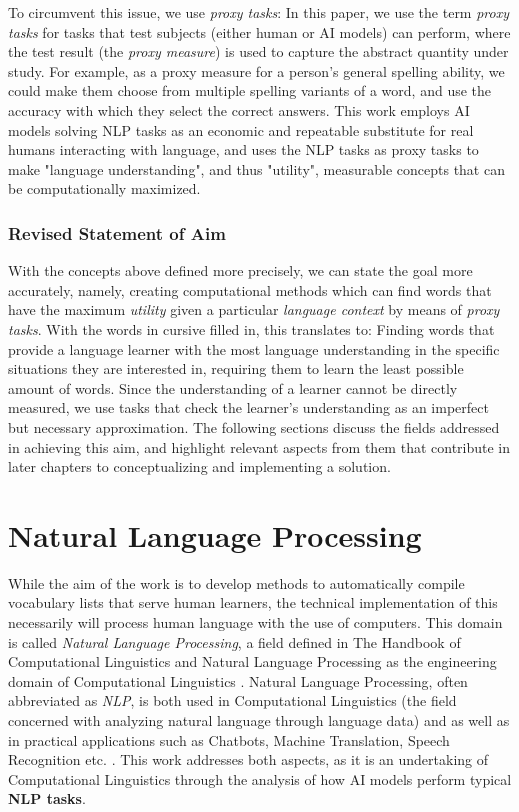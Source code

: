 To circumvent this issue, we use \textit{proxy tasks}:
In this paper, we use the term \textit{proxy tasks} for tasks that test subjects (either human or AI models) can perform, where the test result (the \textit{proxy measure}) is used to capture the abstract quantity under study.
For example, as a proxy measure for a person's general spelling ability, we could make them choose from multiple spelling variants of a word, and use the accuracy with which they select the correct answers.
This work employs AI models solving NLP tasks as an economic and repeatable substitute for real humans interacting with language, and uses the NLP tasks as proxy tasks to make "language understanding", and thus "utility", measurable concepts that can be computationally maximized.

\subsubsection{Revised Statement of Aim}
With the concepts above defined more precisely, we can state the goal more accurately, namely, creating computational methods which can find words that have the maximum \textit{utility} given a particular \textit{language context} by means of \textit{proxy tasks}.
With the words in cursive filled in, this translates to:
Finding words that provide a language learner with the most language understanding in the specific situations they are interested in, requiring them to learn the least possible amount of words.
Since the understanding of a learner cannot be directly measured, we use tasks that check the learner's understanding as an imperfect but necessary approximation.
The following sections discuss the fields addressed in achieving this aim, and highlight relevant aspects from them that contribute in later chapters to conceptualizing and implementing a solution.


\section{Natural Language Processing} \label{sec:natural-language-processing}
While the aim of the work is to develop methods to automatically compile vocabulary lists that serve human learners, the technical implementation of this necessarily will process human language with the use of computers.
This domain is called \textit{Natural Language Processing}, a field defined in The Handbook of Computational Linguistics and Natural Language Processing as the engineering domain of Computational Linguistics \cite{alexanderclarkHandbookComputationalLinguistics2010}.
Natural Language Processing, often abbreviated as \textit{NLP}, is both used in Computational Linguistics (the field concerned with analyzing natural language through language data) and as well as in practical applications such as Chatbots, Machine Translation, Speech Recognition etc. \cite{jurafskySpeechLanguageProcessing2025}.
This work addresses both aspects, as it is an undertaking of Computational Linguistics through the analysis of how AI models perform typical \textbf{NLP tasks}.

